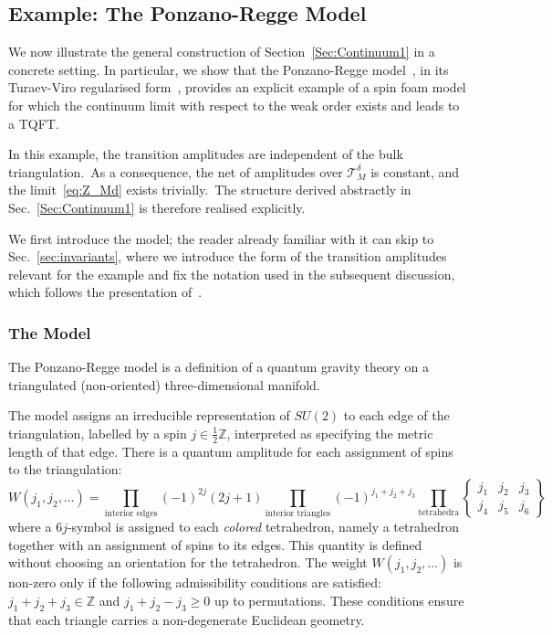 \documentclass[11pt]{article}
\theoremstyle{definition}
\numberwithin{equation}{section}
\begin{document}
\subsection{Example: The Ponzano-Regge Model}\label{Sec:examplePRTVO}

We now illustrate the general construction of Section~\ref{Sec:Continuum1} in a concrete setting. In particular, we show that the Ponzano-Regge model~\cite{Ponzano_Regge_1969}, in its Turaev-Viro regularised form~\cite{Turaev_Viro_1992}, provides an explicit example of a spin foam model for which the continuum limit with respect to the weak order exists and leads to a TQFT.

In this example, the transition amplitudes are independent of the bulk triangulation.~As a consequence, the net of amplitudes over $\mathcal T_M^\delta$ is constant, and the limit~\eqref{eq:Z_Md} exists trivially.~The structure derived abstractly in Sec.~\ref{Sec:Continuum1} is therefore realised explicitly.

We first introduce the model; the reader already familiar with it can skip to Sec.~\ref{sec:invariants}, where we introduce the form of the transition amplitudes relevant for the example and fix the notation used in the subsequent discussion, which follows the presentation of~\cite{Turaev_Viro_1992}.


\subsubsection{The Model}

The Ponzano-Regge model is a definition of a quantum gravity theory on a triangulated (non-oriented) three-dimensional manifold.

The model assigns an irreducible representation of $SU(2)$ to each edge of the triangulation, labelled by a spin $j\in \frac{1}{2}\mathbb{Z}$, interpreted as specifying the metric length of that edge. There is a quantum amplitude for each assignment of spins to the triangulation:
\begin{equation}
\label{eq:PR_weight}
W(j_1, j_2, \dots) =\prod_{\text{interior edges}}(-1)^{2j}(2j+1)\prod_{\text{interior triangles}}(-1)^{j_1+j_2+j_3} \prod_{\text{tetrahedra}}\left\{\begin{matrix}j_1 & j_2 & j_3 \\ j_4 & j_5 & j_6 \end{matrix}\right\}
\end{equation}
where a $6j$-symbol is assigned to each \textit{colored} tetrahedron, namely a tetrahedron together with an assignment of spins to its edges. This quantity is defined without choosing an orientation for the tetrahedron. The weight $W(j_1, j_2, \dots)$ is non-zero only if the following admissibility conditions are satisfied: $j_1+j_2+j_3 \in \mathbb{Z}$ and $j_1+j_2-j_3 \ge 0$ up to permutations. These conditions ensure that each triangle carries a non-degenerate Euclidean geometry.
\end{document}
